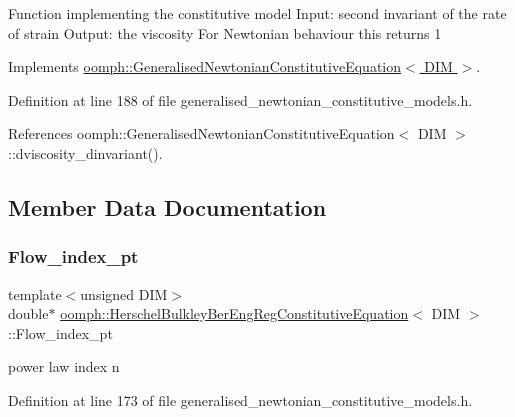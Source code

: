 Function implementing the constitutive model Input\+: second invariant of the rate of strain Output\+: the viscosity For Newtonian behaviour this returns 1 

Implements \hyperlink{classoomph_1_1GeneralisedNewtonianConstitutiveEquation_a3e6d811786e39ca3c3a9b1c46249442f}{oomph\+::\+Generalised\+Newtonian\+Constitutive\+Equation$<$ D\+I\+M $>$}.



Definition at line 188 of file generalised\+\_\+newtonian\+\_\+constitutive\+\_\+models.\+h.



References oomph\+::\+Generalised\+Newtonian\+Constitutive\+Equation$<$ D\+I\+M $>$\+::dviscosity\+\_\+dinvariant().



\subsection{Member Data Documentation}
\mbox{\label{classoomph_1_1HerschelBulkleyBerEngRegConstitutiveEquation_aa4aae1728d199137b187fc075d2e203d}} 
\subsubsection{\texorpdfstring{Flow\+\_\+index\+\_\+pt}{Flow\_index\_pt}}
{\footnotesize\ttfamily template$<$unsigned D\+IM$>$ \\
double$\ast$ \hyperlink{classoomph_1_1HerschelBulkleyBerEngRegConstitutiveEquation}{oomph\+::\+Herschel\+Bulkley\+Ber\+Eng\+Reg\+Constitutive\+Equation}$<$ D\+IM $>$\+::Flow\+\_\+index\+\_\+pt\hspace{0.3cm}{\ttfamily [private]}}



power law index n 



Definition at line 173 of file generalised\+\_\+newtonian\+\_\+constitutive\+\_\+models.\+h.

\mbox{\label{classoomph_1_1HerschelBulkleyBerEngRegConstitutiveEquation_aaaf787351aa31ee08246b7c4edcca066}} 
